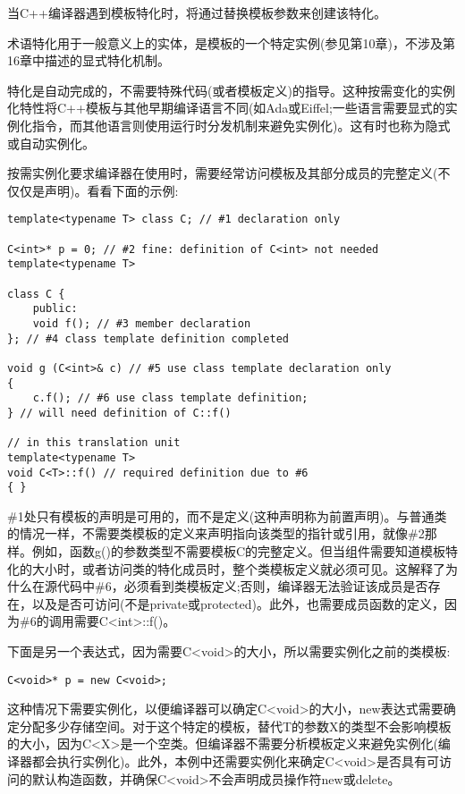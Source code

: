 当C++编译器遇到模板特化时，将通过替换模板参数来创建该特化。

\begin{tcolorbox}[colback=webgreen!5!white,colframe=webgreen!75!black]
\hspace*{0.75cm}术语特化用于一般意义上的实体，是模板的一个特定实例(参见第10章)，不涉及第16章中描述的显式特化机制。
\end{tcolorbox}

特化是自动完成的，不需要特殊代码(或者模板定义)的指导。这种按需变化的实例化特性将C++模板与其他早期编译语言不同(如Ada或Eiffel;一些语言需要显式的实例化指令，而其他语言则使用运行时分发机制来避免实例化)。这有时也称为隐式或自动实例化。

按需实例化要求编译器在使用时，需要经常访问模板及其部分成员的完整定义(不仅仅是声明)。看看下面的示例:

\begin{lstlisting}[style=styleCXX]
template<typename T> class C; // #1 declaration only

C<int>* p = 0; // #2 fine: definition of C<int> not needed
template<typename T>

class C {
	public:
	void f(); // #3 member declaration
}; // #4 class template definition completed

void g (C<int>& c) // #5 use class template declaration only
{
	c.f(); // #6 use class template definition;
} // will need definition of C::f()

// in this translation unit
template<typename T>
void C<T>::f() // required definition due to #6
{ }
\end{lstlisting}

\#1处只有模板的声明是可用的，而不是定义(这种声明称为前置声明)。与普通类的情况一样，不需要类模板的定义来声明指向该类型的指针或引用，就像\#2那样。例如，函数g()的参数类型不需要模板C的完整定义。但当组件需要知道模板特化的大小时，或者访问类的特化成员时，整个类模板定义就必须可见。这解释了为什么在源代码中\#6，必须看到类模板定义;否则，编译器无法验证该成员是否存在，以及是否可访问(不是private或protected)。此外，也需要成员函数的定义，因为\#6的调用需要C<int>::f()。

下面是另一个表达式，因为需要C<void>的大小，所以需要实例化之前的类模板:

\begin{lstlisting}[style=styleCXX]
C<void>* p = new C<void>;
\end{lstlisting}

这种情况下需要实例化，以便编译器可以确定C<void>的大小，new表达式需要确定分配多少存储空间。对于这个特定的模板，替代T的参数X的类型不会影响模板的大小，因为C<X>是一个空类。但编译器不需要分析模板定义来避免实例化(编译器都会执行实例化)。此外，本例中还需要实例化来确定C<void>是否具有可访问的默认构造函数，并确保C<void>不会声明成员操作符new或delete。

